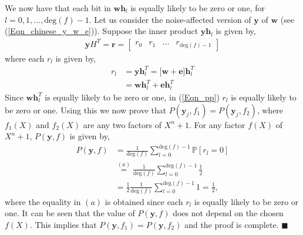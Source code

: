 \documentclass[10pt,journal]{IEEEtran}
\def \deg{{\mathrm{deg}}}
\begin{document}
We now have that each bit in $\mathbf{w}\mathbf{h}_l$ is equally likely to be zero or one, for $l=0,1,\ldots,\deg(f)-1$.
Let us consider the noise-affected version of $\mathbf{y}$ of $\mathbf{w}$ (see (\ref{Eqn_chinese_y_w_e})).
Suppose the inner product $\mathbf{y}\mathbf{h}_l$ is given by,
% 
% 
\begin{align}
%  
\mathbf{y} H^T = \mathbf{r} = \begin{bmatrix} r_0 & r_1 & \ldots & r_{\deg(f)-1}\end{bmatrix} 			     
% 
\end{align}
% 
where each $r_l$ is given by,
% 
\begin{align}
%  
r_l &= \mathbf{y} \mathbf{h}_l^T = \Big[\mathbf{w} + \mathbf{e} \Big] \mathbf{h}_l^T \\
    &= \mathbf{w}\mathbf{h}_l^T + \mathbf{e} \mathbf{h}_l^T
\label{Eqn_pp}    
% 
\end{align}
% 
Since $\mathbf{w}\mathbf{h}_l^T$ is equally likely to be zero or one, in (\ref{Eqn_pp}) $r_l$ is equally likely to be zero or one.
% 
Using this we now prove that $P(\mathbf{y}_j,f_1) = P(\mathbf{y}_j,f_2)$, where $f_1(X)$ and $f_2(X)$ are any two factors of $X^n+1$.
For any factor $f(X)$ of $X^n+1$, $P(\mathbf{y},f)$ is given by,
% 
\begin{equation}
% 
\begin{aligned}
%  
P(\mathbf{y},f) &= \frac{1}{\deg(f)} \sum_{l=0}^{\deg(f)-1} \mathbb{P}[r_l = 0] \\
		    &\stackrel{(a)}{=} \frac{1}{\deg(f)} \sum_{l=0}^{\deg(f)-1} \frac{1}{2} \\
		    &= \frac{1}{2} \frac{1}{\deg(f)} \sum_{l=0}^{\deg(f)-1} 1 
		    = \frac{1}{2}, 		    
% 
\end{aligned}
% 
\label{Eqn_chinese_Pjf_expression_appendix}
% 
\end{equation}
% 
where the equality in $(a)$ is obtained since each $r_l$ is equally likely to be zero or one. 
It can be seen that the value of $P(\mathbf{y},f)$ does not depend on the chosen $f(X)$.
This implies that $P(\mathbf{y},f_1) = P(\mathbf{y},f_2)$ and the proof is complete.
\hfill $\blacksquare$


\end{document}
